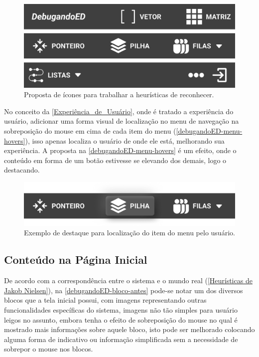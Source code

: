 \begin{figure}[htb]
    \begin{center}
        \includegraphics[scale=1]{figs/debugandoED-menu-icons.png}
    \end{center}
    \caption{\label{debugandoED-menu-icons}Proposta de ícones para trabalhar a heurísticas de reconhecer.}
\end{figure}

No conceito da \autoref{Experiência_de_Usuário}, onde é tratado a experiência do usuário, adicionar uma forma visual de localização no menu de navegação na sobreposição do mouse em cima de cada item do menu (\autoref{debugandoED-menu-hovers}), isso apenas localiza o usuário de onde ele está, melhorando sua experiência. A proposta na \autoref{debugandoED-menu-hovers} é um efeito, onde o conteúdo em forma de um botão estivesse se elevando dos demais, logo o destacando.

\begin{figure}[htb]
    \begin{center}
        \includegraphics[scale=1]{figs/debugandoED-menu-hover.png}
    \end{center}
    \caption{\label{debugandoED-menu-hovers}Exemplo de destaque para localização do item do menu pelo usuário.}
\end{figure}

\subsection{Conteúdo na Página Inicial}
\label{Conteúdo_na_Pagina_Inicial}

De acordo com a correspondência entre o sistema e o mundo real (\autoref{Heurísticas de Jakob Nielsen}), na \autoref{debugandoED-bloco-antes} pode-se notar um dos diversos blocos que a tela inicial possui, com imagens representando outras funcionalidades específicas do sistema, imagens não tão simples para usuário leigos no assunto, embora tenha o efeito de sobreposição do mouse no qual é mostrado mais informações sobre aquele bloco, isto pode ser melhorado colocando alguma forma de indicativo ou informação simplificada sem a necessidade de sobrepor o mouse nos blocos.
    
